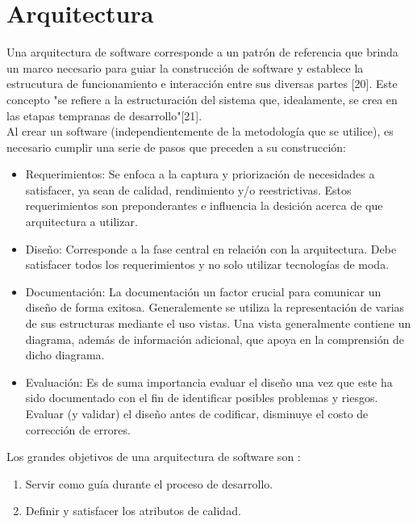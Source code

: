 \section{Arquitectura}

Una arquitectura de software corresponde a un patrón de referencia que brinda
un marco necesario para guiar la construcción de software y establece la estrucutura de 
funcionamiento  e interacción entre sus diversas partes [20]. Este concepto 
"se refiere a la estructuración del sistema que, idealamente, se crea en las etapas 
tempranas de desarrollo"[21].\\ 

Al crear un software (independientemente de la metodología que se utilice), es necesario
cumplir una serie de pasos  que preceden a su construcción:
\begin{itemize}
 \item Requerimientos: Se enfoca a la captura y priorización de necesidades a satisfacer,
  ya sean de calidad, rendimiento y/o reestrictivas. Estos requerimientos son preponderantes
  e influencia la desición acerca de que arquitectura a utilizar.
 \item Diseño: Corresponde a la fase central en relación con la arquitectura. Debe satisfacer todos
  los requerimientos y no solo utilizar tecnologías de moda.
 \item Documentación: La documentación un factor crucial para comunicar un diseño de forma exitosa.
  Generalemente se utiliza la representación de varias de sus estructuras mediante el uso vistas. 
  Una vista generalmente contiene un diagrama, además de información adicional, que apoya en la 
  comprensión de dicho diagrama.
 \item Evaluación: Es de suma importancia evaluar el diseño una vez que este ha sido documentado 
  con el fin de identificar posibles problemas y riesgos. Evaluar (y validar) el diseño antes
  de codificar, disminuye el costo de corrección de errores.
\end{itemize}


Los grandes objetivos de una arquitectura de software son :
\begin{enumerate}
 \item Servir como guía durante el proceso de desarrollo. 
 \item Definir y satisfacer los atributos de calidad. 
\end{enumerate}
  

